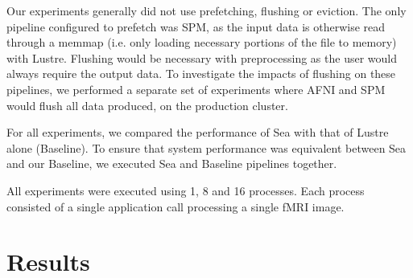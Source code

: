     Our experiments generally did not use prefetching, flushing or eviction. The
    only pipeline configured to prefetch was SPM, as the input data is otherwise
    read through a memmap (i.e. only loading necessary portions of the file to memory) with Lustre. Flushing would be necessary with
    preprocessing as the user would always require the output data. To
    investigate the impacts of flushing on these pipelines, we performed a
    separate set of experiments where AFNI and SPM would flush all data
    produced, on the production cluster.

    For all experiments, we compared the performance of Sea with that of Lustre
    alone (Baseline). To ensure that system performance was equivalent between
    Sea and our Baseline, we executed Sea and Baseline pipelines together.
    
    All experiments were executed using 1, 8 and 16 processes. Each process consisted of a single application call processing a single fMRI image.
    
    \section{Results}



